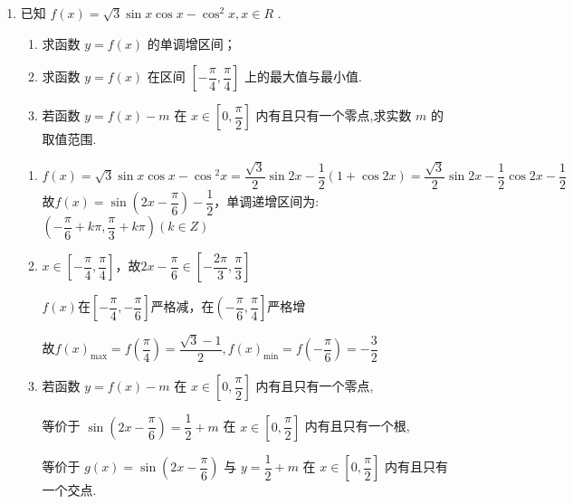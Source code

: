 \begin{enumerate}
    \item 已知 $f\left( x\right)  = \sqrt{3}\sin x\cos x - {\cos }^{2}x,x \in  R$ .

    \begin{enumerate}
        \item 求函数 $y = f\left( x\right)$ 的单调增区间；
        \item 求函数 $y = f\left( x\right)$ 在区间 $\left\lbrack  {-\dfrac{\pi }{4},\dfrac{\pi }{4}}\right\rbrack$ 上的最大值与最小值.
        \item 若函数 $y = f\left( x\right)  - m$ 在 $x \in  \left\lbrack  {0,\dfrac{\pi }{2}}\right\rbrack$ 内有且只有一个零点,求实数 $m$ 的取值范围.
    \end{enumerate}

    \begin{jieda}
        \begin{enumerate}
            \item $f\left( x\right)  = \sqrt{3}\sin x\cos x - \cos {}^{2}x = \dfrac{\sqrt{3}}{2}\sin {2x} - \dfrac{1}{2}\left( {1 + \cos {2x}}\right) = \dfrac{\sqrt{3}}{2}\sin {2x} - \dfrac{1}{2}\cos {2x} - \dfrac{1}{2}$
            故$f(x) = \sin \left( {{2x} - \dfrac{\pi }{6}}\right)  - \dfrac{1}{2}$，单调递增区间为: $\left( {-\dfrac{\pi }{6} + {k\pi },\dfrac{\pi }{3} + {k\pi }}\right) \left( {k \in  Z}\right)$ 
            \item $x \in \left\lbrack  {-\dfrac{\pi }{4},\dfrac{\pi }{4}}\right\rbrack$，故$2x-\dfrac{\pi}{6} \in \left\lbrack  {-\dfrac{2\pi }{3},\dfrac{\pi }{3}}\right\rbrack$
            
            $f(x)$在$\left[-\dfrac{\pi}{4}, -\dfrac{\pi}{6}\right]$严格减，在$\left(-\dfrac{\pi}{6}, \dfrac{\pi}{4}\right]$严格增
            
            故$f{\left( x\right) }_{\max } = f\left(\dfrac{\pi}{4}\right) = \dfrac{\sqrt{3} - 1}{2},f{\left( x\right) }_{\min } = f\left(-\dfrac{\pi}{6}\right) = - \dfrac{3}{2}$

            \item 若函数 $y = f\left( x\right)  - m$ 在 $x \in  \left\lbrack  {0,\dfrac{\pi }{2}}\right\rbrack$ 内有且只有一个零点,
            
            等价于 $\sin \left( {{2x} - \dfrac{\pi }{6}}\right)  = \dfrac{1}{2} + m$ 在 $x \in  \left\lbrack  {0,\dfrac{\pi }{2}}\right\rbrack$ 内有且只有一个根,
            
            等价于 $g\left( x\right)  = \sin \left( {{2x} - \dfrac{\pi }{6}}\right)$ 与 $y = \dfrac{1}{2} + m$ 在 $x \in  \left\lbrack  {0,\dfrac{\pi }{2}}\right\rbrack$ 内有且只有一个交点.
            

\end{enumerate}
\end{jieda}
\end{enumerate}
